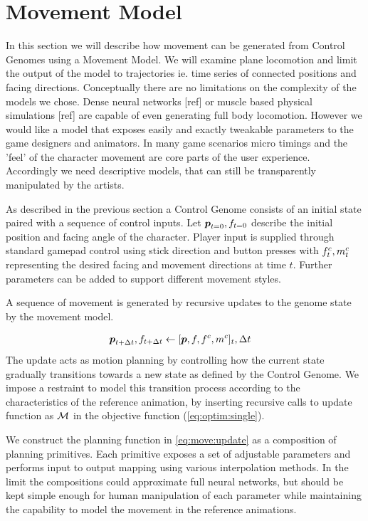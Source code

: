\section{Movement Model}
In this section we will describe how movement can be generated from Control Genomes using a Movement Model. We will examine plane locomotion and limit the output of the model to trajectories ie. time series of connected positions and facing directions. 
Conceptually there are no limitations on the complexity of the models we chose. Dense neural networks [ref] or muscle based physical simulations [ref] are capable of even generating full body locomotion. However we would like a model that exposes easily and exactly tweakable parameters to the game designers and animators. In many game scenarios micro timings and the 'feel' of the character movement are core parts of the user experience. Accordingly we need descriptive models, that can still be transparently manipulated by the artists. 

As described in the previous section a Control Genome consists of an initial state paired with a sequence of control inputs. Let $\boldsymbol{p }_{t=0},f_{t=0}$ describe the initial position and facing angle of the character. Player input is supplied through standard gamepad control using stick direction and button presses with $f^c_t, m^c_t$ representing the desired facing and movement directions at time $t$. Further parameters can be added to support different movement styles.   

A sequence of movement is generated by recursive updates to the genome state by the movement model.

\begin{subequations}
\begin{align}
    \boldsymbol{p }_{t+\Delta{t}},f_{t+\Delta{t}}&\leftarrow[\boldsymbol{p },f,f^c,m^c]_t,\Delta{t}\label{eq:move:update}
\end{align}
\end{subequations}
The update  acts as motion planning by controlling how the current state gradually transitions towards a new state as defined by the Control Genome. We impose a restraint to model this transition process according to the characteristics of the reference animation, by inserting recursive calls to update function as $\mathcal{M}$ in the objective function (\ref{eq:optim:single}).

We construct the planning function in \ref{eq:move:update} as a composition of planning primitives. Each primitive exposes a set of adjustable parameters and performs input to output mapping using various interpolation methods. In the limit the compositions could approximate full neural networks, but should be kept simple enough for human manipulation of each parameter while maintaining the capability to model the movement in the reference animations.     

